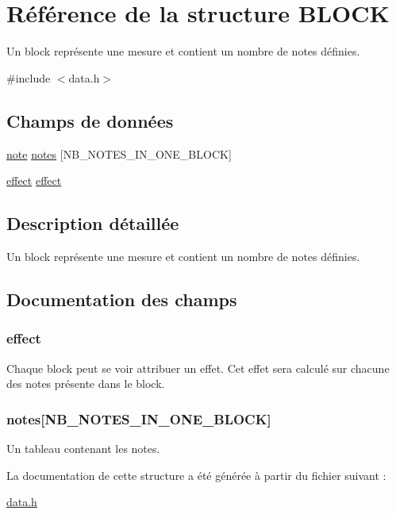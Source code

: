 \hypertarget{struct_b_l_o_c_k}{
\section{Référence de la structure BLOCK}
\label{struct_b_l_o_c_k}
}


Un block représente une mesure et contient un nombre de notes définies.  




{\ttfamily \#include $<$data.h$>$}

\subsection*{Champs de données}
\begin{DoxyCompactItemize}
\item 
\hyperlink{struct_n_o_t_e}{note} \hyperlink{struct_b_l_o_c_k_a67c3894ec855ff15d73374ec4a2394e6}{notes} \mbox{[}NB\_\-NOTES\_\-IN\_\-ONE\_\-BLOCK\mbox{]}
\item 
\hyperlink{struct_e_f_f_e_c_t}{effect} \hyperlink{struct_b_l_o_c_k_a741151ee9cb5c0bde79f6dfee55f951a}{effect}
\end{DoxyCompactItemize}


\subsection{Description détaillée}
Un block représente une mesure et contient un nombre de notes définies. 

\subsection{Documentation des champs}
\hypertarget{struct_b_l_o_c_k_a741151ee9cb5c0bde79f6dfee55f951a}{
\subsubsection[{effect}]{ {\bf effect}}}
\label{struct_b_l_o_c_k_a741151ee9cb5c0bde79f6dfee55f951a}
Chaque block peut se voir attribuer un effet. Cet effet sera calculé sur chacune des notes présente dans le block. \hypertarget{struct_b_l_o_c_k_a67c3894ec855ff15d73374ec4a2394e6}{
\subsubsection[{notes}]{ {\bf notes}\mbox{[}NB\_\-NOTES\_\-IN\_\-ONE\_\-BLOCK\mbox{]}}}
\label{struct_b_l_o_c_k_a67c3894ec855ff15d73374ec4a2394e6}
Un tableau contenant les notes. 

La documentation de cette structure a été générée à partir du fichier suivant :\begin{DoxyCompactItemize}
\item 
\hyperlink{data_8h}{data.h}\end{DoxyCompactItemize}
